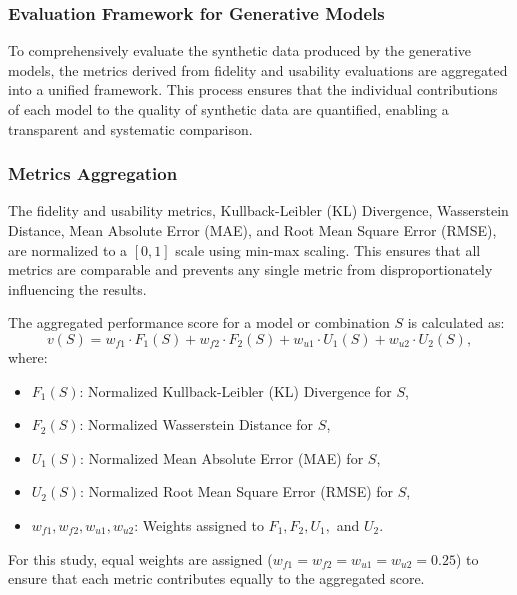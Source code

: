 \documentclass{article}
\begin{document}
\subsubsection{Evaluation Framework for Generative Models}
To comprehensively evaluate the synthetic data produced by the generative models, the metrics derived from fidelity and usability evaluations are aggregated into a unified framework. This process ensures that the individual contributions of each model to the quality of synthetic data are quantified, enabling a transparent and systematic comparison.

\subsubsection*{Metrics Aggregation}

The fidelity and usability metrics, Kullback-Leibler (KL) Divergence, Wasserstein Distance, Mean Absolute Error (MAE), and Root Mean Square Error (RMSE), are normalized to a \([0,1]\) scale using min-max scaling. This ensures that all metrics are comparable and prevents any single metric from disproportionately influencing the results. 

The aggregated performance score for a model or combination \(S\) is calculated as: 
\[
v(S) = w_{f1} \cdot F_1(S) + w_{f2} \cdot F_2(S) + w_{u1} \cdot U_1(S) + w_{u2} \cdot U_2(S),
\]
where:
\begin{itemize}
    \item \(F_1(S)\): Normalized Kullback-Leibler (KL) Divergence for \(S\),
    \item \(F_2(S)\): Normalized Wasserstein Distance for \(S\),
    \item \(U_1(S)\): Normalized Mean Absolute Error (MAE) for \(S\),
    \item \(U_2(S)\): Normalized Root Mean Square Error (RMSE) for \(S\),
    \item \(w_{f1}, w_{f2}, w_{u1}, w_{u2}\): Weights assigned to \(F_1, F_2, U_1,\) and \(U_2\).
\end{itemize}

For this study, equal weights are assigned (\(w_{f1} = w_{f2} = w_{u1} = w_{u2} = 0.25\)) to ensure that each metric contributes equally to the aggregated score.
\end{document}
